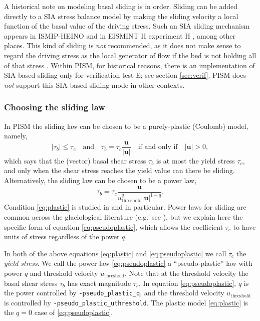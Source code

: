 A historical note on modeling basal sliding is in order.  Sliding can be added directly to a SIA stress balance model by making the sliding velocity a local function of the basal value of the driving stress.  Such an SIA sliding mechanism appears in ISMIP-HEINO \cite{Calovetal2009HEINOfinal} and in EISMINT II experiment H \cite{EISMINT00}, among other places.  This kind of sliding is \emph{not} recommended, as it does not make sense to regard the driving stress as the local generator of flow if the bed is not holding all of that stress \cite{BBssasliding,Fowler01}.  Within PISM, for historical reasons, there is an implementation of SIA-based sliding only for verification test E; see section \ref{sec:verif}.  PISM does \emph{not} support this SIA-based sliding mode in other contexts.

\subsubsection*{Choosing the sliding law}  In PISM the sliding law can be chosen to be a purely-plastic (Coulomb) model, namely,
\begin{equation}
   |\tau_b| \le \tau_c \quad \text{and} \quad \tau_b = \tau_c \frac{\mathbf{u}}{|\mathbf{u}|} \quad\text{if and only if}\quad |\mathbf{u}| > 0,
\label{eq:plastic}
\end{equation}
which says that the (vector) basal shear stress $\tau_b$ is at most the yield stress $\tau_c$, and only when the shear stress reaches the yield value can there be sliding.  Alternatively, the sliding law can be chosen to be a power law,
\begin{equation}
\tau_b = \tau_c \frac{\mathbf{u}}{u_{\text{threshold}}^q |\mathbf{u}|^{1-q}}.
\label{eq:pseudoplastic}
\end{equation}
Condition \eqref{eq:plastic} is studied in \cite{SchoofStream} and \cite{SchoofTill} in particular.  Power laws for sliding are common across the glaciological literature (e.g.~see \cite{CuffeyPaterson,GreveBlatter2009}), but we explain here the specific form of equation \eqref{eq:pseudoplastic}, which allows the coefficient $\tau_c$ to have units of stress regardless of the power $q$.

In both of the above equations \eqref{eq:plastic} and \eqref{eq:pseudoplastic} we call $\tau_c$ the \emph{yield stress}.  We call the power law \eqref{eq:pseudoplastic} a ``pseudo-plastic'' law with power $q$ and threshold velocity $u_{\text{threshold}}$.  Note that at the threshold velocity the basal shear stress $\tau_b$ has exact magnitude $\tau_c$.  In equation \eqref{eq:pseudoplastic}, $q$ is the power controlled by \texttt{-pseudo_plastic_q}, and the threshold velocity $u_{\text{threshold}}$ is controlled by \texttt{-pseudo_plastic_uthreshold}.  The plastic model \eqref{eq:plastic} is the $q=0$ case of \eqref{eq:pseudoplastic}.

